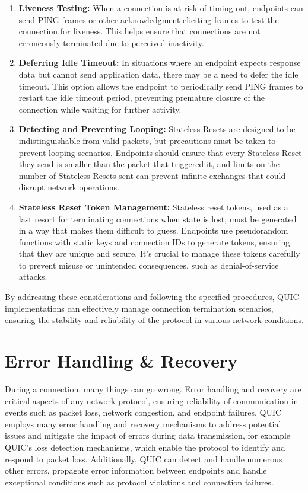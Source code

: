 \begingroup
\renewcommand\labelenumi{(\theenumi)}
\begin{enumerate}
\item \textbf{Liveness Testing:} When a connection is at risk of timing out, endpoints can send PING frames or other acknowledgment-eliciting frames to test the connection for liveness. This helps ensure that connections are not erroneously terminated due to perceived inactivity. \label{liveness_testing}
\item \textbf{Deferring Idle Timeout:} In situations where an endpoint expects response data but cannot send application data, there may be a need to defer the idle timeout. This option allows the endpoint to periodically send PING frames to restart the idle timeout period, preventing premature closure of the connection while waiting for further activity. \label{deferring_idle_timeout}
\item \textbf{Detecting and Preventing Looping:} Stateless Resets are designed to be indistinguishable from valid packets, but precautions must be taken to prevent looping scenarios. Endpoints should ensure that every Stateless Reset they send is smaller than the packet that triggered it, and limits on the number of Stateless Resets sent can prevent infinite exchanges that could disrupt network operations. \label{detecting_and_preventing_looping}
\item \textbf{Stateless Reset Token Management:} Stateless reset tokens, used as a last resort for terminating connections when state is lost, must be generated in a way that makes them difficult to guess. Endpoints use pseudorandom functions with static keys and connection IDs to generate tokens, ensuring that they are unique and secure. It's crucial to manage these tokens carefully to prevent misuse or unintended consequences, such as denial-of-service attacks. \label{stateless_reset_token_management}
\end{enumerate}
\endgroup

By addressing these considerations and following the specified procedures, QUIC implementations can effectively manage connection termination scenarios, ensuring the stability and reliability of the protocol in various network conditions.

\section{Error Handling \& Recovery} \label{error_handling_recovery}

During a connection, many things can go wrong. Error handling and recovery are critical aspects of any network protocol, ensuring reliability of communication in events such as packet loss, network congestion, and endpoint failures. QUIC employs many error handling and recovery mechanisms to address potential issues and mitigate the impact of errors during data transmission, for example QUIC's loss detection mechanisms, which enable the protocol to identify and respond to packet loss. Additionally, QUIC can detect and handle numerous other errors, propagate error information between endpoints and handle exceptional conditions such as protocol violations and connection failures. 

